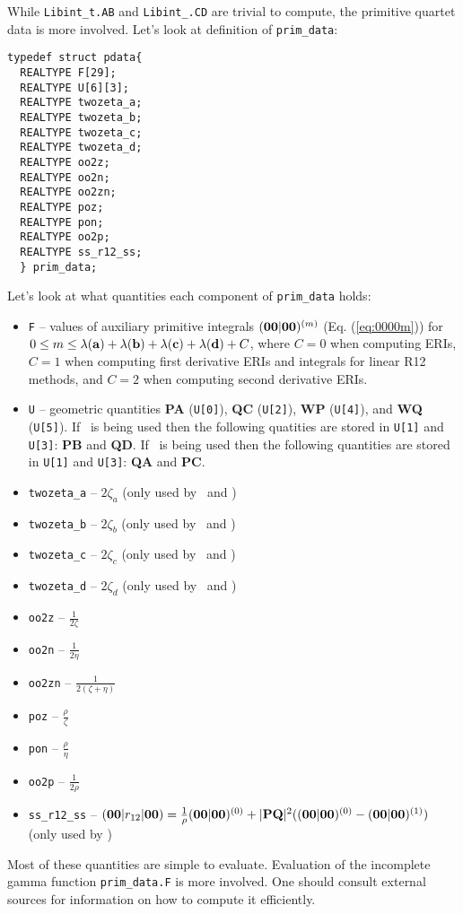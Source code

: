 \documentclass[12pt]{article}
\begin{document}
While {\tt Libint\_t.AB} and {\tt Libint\_.CD} are trivial to compute,
the primitive quartet data is more involved. Let's look at definition of {\tt prim\_data}:
\begin{verbatim}
typedef struct pdata{
  REALTYPE F[29];
  REALTYPE U[6][3];
  REALTYPE twozeta_a;
  REALTYPE twozeta_b;
  REALTYPE twozeta_c;
  REALTYPE twozeta_d;
  REALTYPE oo2z;
  REALTYPE oo2n;
  REALTYPE oo2zn;
  REALTYPE poz;
  REALTYPE pon;
  REALTYPE oo2p;
  REALTYPE ss_r12_ss;
  } prim_data;
\end{verbatim}
Let's look at what quantities each component of {\tt prim\_data} holds:
\begin{itemize}
\item {\tt F} -- values of auxiliary primitive integrals $({\bf 00}|{\bf 00})^{(m)}$ (Eq. (\ref{eq:0000m}))
for $0 \leq m \leq \lambda({\bf a}) + \lambda({\bf b}) + \lambda({\bf c}) + \lambda({\bf d}) + C$,
where $C = 0$ when computing ERIs, $C=1$ when computing first derivative ERIs and integrals for
linear R12 methods, and $C=2$ when computing second derivative ERIs.
\item {\tt U} -- geometric quantities {\bf PA} ({\tt U[0]}), {\bf QC} ({\tt U[2]}),
{\bf WP} ({\tt U[4]}), and {\bf WQ} ({\tt U[5]}). If \libderiv\ is being used then
the following quatities are stored in {\tt U[1]} and {\tt U[3]}: {\bf PB} and {\bf QD}.
If \librij\ is being used then
the following quantities are stored in {\tt U[1]} and {\tt U[3]}: {\bf QA} and {\bf PC}.
\item {\tt twozeta\_a} -- $2 \zeta_a$ (only used by \libderiv\ and \librij)
\item {\tt twozeta\_b} -- $2 \zeta_b$ (only used by \libderiv\ and \librij)
\item {\tt twozeta\_c} -- $2 \zeta_c$ (only used by \libderiv\ and \librij)
\item {\tt twozeta\_d} -- $2 \zeta_d$ (only used by \libderiv\ and \librij)
\item {\tt oo2z} -- $\frac{1}{2\zeta}$
\item {\tt oo2n} -- $\frac{1}{2\eta}$
\item {\tt oo2zn} -- $\frac{1}{2(\zeta+\eta)}$
\item {\tt poz} -- $\frac{\rho}{\zeta}$
\item {\tt pon} -- $\frac{\rho}{\eta}$
\item {\tt oo2p} -- $\frac{1}{2\rho}$
\item {\tt ss\_r12\_ss} -- $({\bf 00}|r_{12}|{\bf 00}) = \frac{1}{\rho} ({\bf 00}|{\bf 00})^{(0)} +
|{\bf PQ}|^2 (({\bf 00}|{\bf 00})^{(0)} - ({\bf 00}|{\bf 00})^{(1)})$
(only used by \librij)
\end{itemize}
Most of these quantities are simple to evaluate. Evaluation of the incomplete gamma function
{\tt prim\_data.F} is more involved. One should consult external sources for information on how
to compute it efficiently.\cite{Obara86,Gill91}
\end{document}
